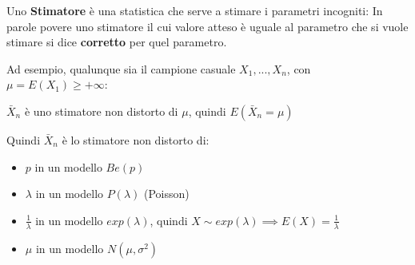 Uno \textbf{Stimatore} è una statistica che serve a stimare i parametri incogniti:
In parole povere uno stimatore il cui valore atteso è uguale al parametro
che si vuole stimare si dice \textbf{corretto} per quel parametro.

Ad esempio, qualunque sia il campione casuale $X_1,...,X_n$, con $\mu = E(X_1)\geq +\infty$:
\begin{center}
    $\bar{X}_n$ è uno stimatore non distorto di $\mu$, quindi $E(\bar{X}_n = \mu)$
\end{center}
Quindi $\bar{X}_n$ è lo stimatore non distorto di:
\begin{itemize}
    \item $p$ in un modello $Be(p)$
    \item $\lambda$ in un modello $P(\lambda)$ (Poisson)
    \item $\frac{1}{\lambda}$ in un modello $exp(\lambda)$, quindi $X\sim exp(\lambda) \implies E(X)=\frac{1}{\lambda}$
    \item $\mu$ in un modello $N(\mu,\sigma^2)$
\end{itemize}


